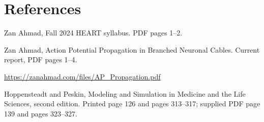 \documentclass[11pt,letterpaper]{article}
\theoremstyle{definition}\newtheorem{definition}{Definition}\newtheorem{example}{Example}
\numberwithin{equation}{section}
\begin{document}
\section*{References}
\noindent\begin{minipage}{\linewidth}
Zan Ahmad, Fall 2024 HEART syllabus. PDF pages 1--2.

\end{minipage}\par\medskip
\noindent\begin{minipage}{\linewidth}
Zan Ahmad, Action Potential Propagation in Branched Neuronal Cables. Current report, PDF pages 1--4.

\url{https://zanahmad.com/files/AP_Propagation.pdf}
\end{minipage}\par\medskip
\noindent\begin{minipage}{\linewidth}
Hoppensteadt and Peskin, Modeling and Simulation in Medicine and the Life Sciences, second edition. Printed page 126 and pages 313--317; supplied PDF page 139 and pages 323--327.

\end{minipage}\par\medskip
\end{document}
